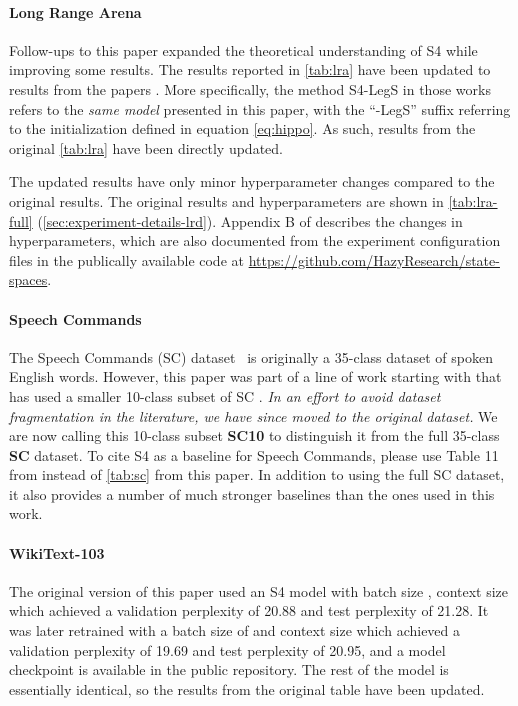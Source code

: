 \documentclass{article}
\begin{document}
\paragraph{Long Range Arena}

Follow-ups to this paper expanded the theoretical understanding of S4 while improving some results.
The results reported in \cref{tab:lra} have been updated to results from the papers \citep{gu2022s4d,gu2022hippo}.
More specifically, the method S4-LegS in those works refers to the \emph{same model} presented in this paper, with the ``-LegS'' suffix referring to the initialization defined in equation \eqref{eq:hippo}. As such, results from the original \cref{tab:lra} have been directly updated.

The updated results have only minor hyperparameter changes compared to the original results. The original results and hyperparameters are shown in \cref{tab:lra-full} (\cref{sec:experiment-details-lrd}).
Appendix B of \citep{gu2022s4d} describes the changes in hyperparameters, which are also documented from the experiment configuration files in the publically available code at \url{https://github.com/HazyResearch/state-spaces}.

\paragraph{Speech Commands}

The Speech Commands (SC) dataset~\citep{Warden2018SpeechCA} is originally a 35-class dataset of spoken English words.
However, this paper was part of a line of work starting with \citet{kidger2020neural} that has used a smaller 10-class subset of SC \citep{kidger2020neural,romero2021ckconv,gu2021lssl,romero2022flexconv}.
\emph{In an effort to avoid dataset fragmentation in the literature, we have since moved to the original dataset.}
We are now calling this 10-class subset \textbf{SC10} to distinguish it from the full 35-class \textbf{SC} dataset.
To cite S4 as a baseline for Speech Commands, please use Table 11 from \citep{gu2022s4d} instead of \cref{tab:sc} from this paper.
In addition to using the full SC dataset, it also provides a number of much stronger baselines than the ones used in this work.


\paragraph{WikiText-103}

The original version of this paper used an S4 model with batch size , context size  which achieved a validation perplexity of 20.88 and test perplexity of 21.28.
It was later retrained with a batch size of  and context size  which achieved a validation perplexity of 19.69 and test perplexity of 20.95, and a model checkpoint is available in the public repository.
The rest of the model is essentially identical, so the results from the original table have been updated.
 
\end{document}
